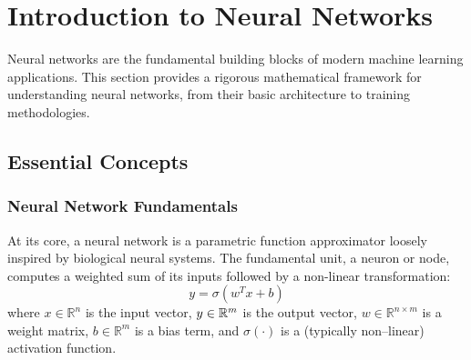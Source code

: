 \section{Introduction to Neural Networks}
Neural networks are the fundamental building blocks of modern machine learning applications.
%
This section provides a rigorous mathematical framework for understanding neural networks, from their basic architecture to training methodologies.

    \subsection{Essential Concepts}
        \subsubsection{Neural Network Fundamentals}
            At its core, a neural network is a parametric function approximator loosely inspired by biological neural systems.
            The fundamental unit, a neuron or node, computes a weighted sum of its inputs followed by a non-linear transformation:
            \begin{equation}
            y = \sigma(w^T x + b)
            \end{equation}
            where \(x \in \mathbb{R}^n\) is the input vector, \(y\in\mathbb{R}^{m}\) is the output vector, \(w \in \mathbb{R}^{n\times m}\) is a weight matrix, \(b \in \mathbb{R}^m\) is a bias term, and \(\sigma(\cdot)\) is a (typically non--linear) activation function.
            
